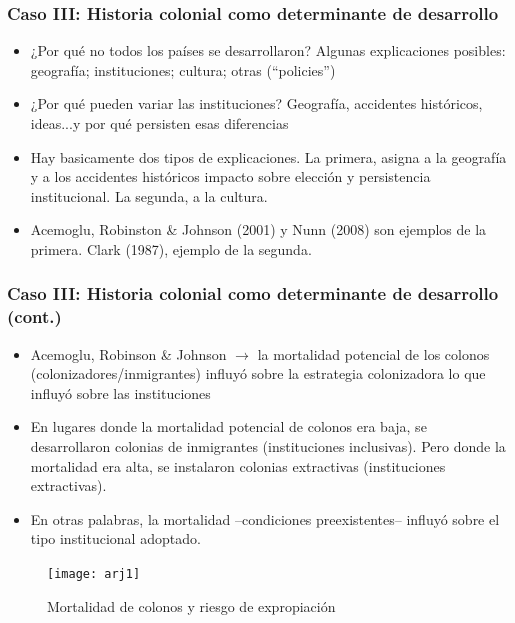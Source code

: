 \documentclass[handout,final,xcolor=dvipsnames]{beamer}
\begin{document}
\begin{frame}\frametitle{Caso III: Historia colonial como determinante
  de desarrollo}
\begin{itemize}\itemsep 15pt
\item ¿Por qué no todos los países se desarrollaron? Algunas
  explicaciones posibles: geografía; instituciones; cultura; otras
  (``policies'')
  \item ¿Por qué pueden variar las instituciones? Geografía,
    accidentes históricos, ideas...y por qué persisten esas
    diferencias
  \item Hay basicamente dos tipos de explicaciones. La primera,
    asigna a la geografía y a los accidentes históricos impacto sobre
    elección y persistencia institucional. La segunda, a la cultura.
    \item Acemoglu, Robinston \& Johnson (2001) y Nunn (2008) son
      ejemplos de la primera. Clark (1987), ejemplo de la segunda.
    \end{itemize}
\end{frame}



\begin{frame}\frametitle{Caso III: Historia colonial como determinante
  de desarrollo (cont.)}
\begin{itemize}\itemsep 15pt
\item Acemoglu, Robinson \& Johnson $\longrightarrow$ la mortalidad potencial de
  los colonos (colonizadores/inmigrantes) influyó sobre la estrategia
  colonizadora lo que influyó sobre las instituciones
  \item En lugares donde la mortalidad potencial de colonos era
    baja, se desarrollaron colonias de inmigrantes (instituciones
    inclusivas). Pero donde la mortalidad era alta, se instalaron
    colonias extractivas (instituciones extractivas).
    \item En otras palabras, la mortalidad --condiciones
      preexistentes-- influyó sobre el tipo institucional adoptado. 
    \end{itemize}
\end{frame}

\begin{frame}
 \begin{figure}[htbp]
    \centering \vspace{1cm}
    \texttt{[image: arj1]}
    \caption{Mortalidad de colonos y riesgo de expropiación}
    \label{fig:arj1}
  \end{figure}
\end{frame}
\end{document}
